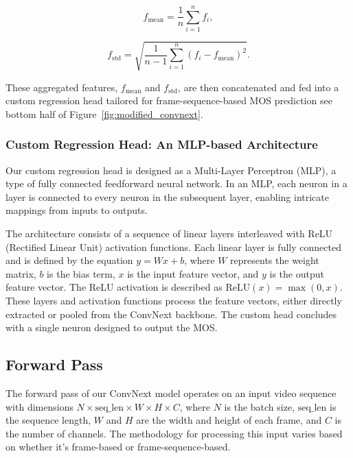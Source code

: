 \documentclass[a4paper,12pt,openright]{book}
\begin{document}
\begin{equation}
f_{\mathrm{mean}} = \frac{1}{n}\sum_{i=1}^{n} f_{i},
\end{equation}

\begin{equation}
f_{\mathrm{std}} = \sqrt{\frac{1}{n - 1}\sum_{i=1}^{n}(f_{i} - f_{\mathrm{mean}})^2}.
\end{equation}

These aggregated features, \(f_{\mathrm{mean}}\) and \(f_{\mathrm{std}}\), are then concatenated and fed into a custom regression head tailored for frame-sequence-based MOS prediction see bottom half of Figure~\ref{fig:modified_convnext}.



\subsubsection{Custom Regression Head: An MLP-based Architecture}

Our custom regression head is designed as a Multi-Layer Perceptron (MLP), a type of fully connected feedforward neural network. In an MLP, each neuron in a layer is connected to every neuron in the subsequent layer, enabling intricate mappings from inputs to outputs.

The architecture consists of a sequence of linear layers interleaved with ReLU (Rectified Linear Unit) activation functions. Each linear layer is fully connected and is defined by the equation \(y = Wx + b\), where \(W\) represents the weight matrix, \(b\) is the bias term, \(x\) is the input feature vector, and \(y\) is the output feature vector. The ReLU activation is described as \(\text{ReLU}(x) = \max(0, x)\).
These layers and activation functions process the feature vectors, either directly extracted or pooled from the ConvNext backbone. The custom head concludes with a single neuron designed to output the MOS.
\newpage
\subsection{Forward Pass}

The forward pass of our ConvNext model operates on an input video sequence with dimensions \(N \times \text{seq\_len} \times W \times H \times C\), where \(N\) is the batch size, \(\text{seq\_len}\) is the sequence length, \(W\) and \(H\) are the width and height of each frame, and \(C\) is the number of channels. The methodology for processing this input varies based on whether it's frame-based or frame-sequence-based.
\end{document}
